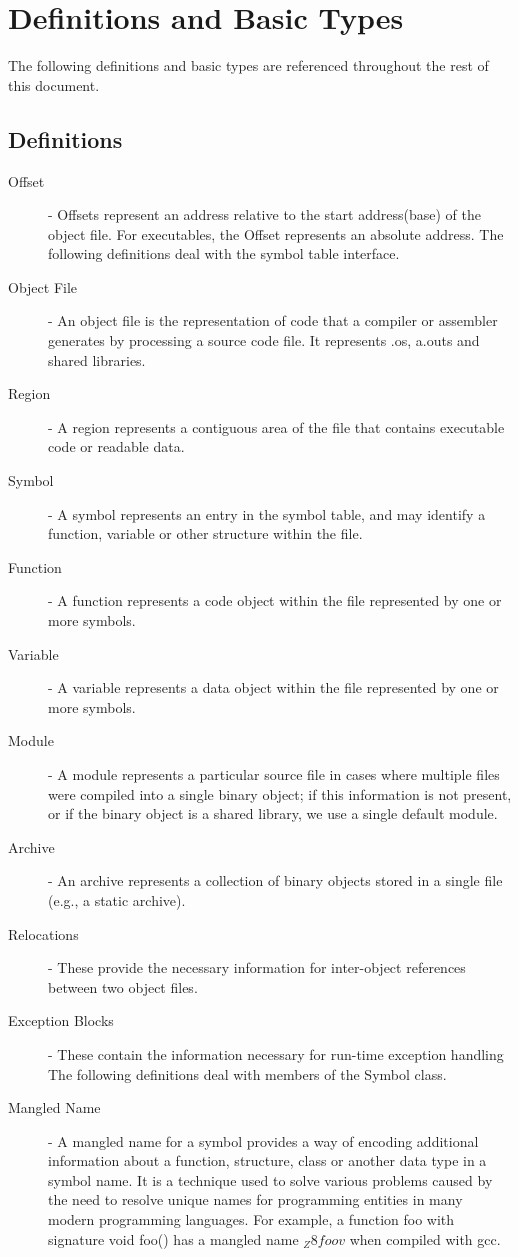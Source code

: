\section{Definitions and Basic Types}

The following definitions and basic types are referenced throughout the rest of this document.

\subsection{Definitions}

\begin{description}
\item[Offset] - Offsets represent an address relative to the start address(base) of the object file. For executables, the Offset represents an absolute address.
The following definitions deal with the symbol table interface.
\item[Object File] - An object file is the representation of code that a compiler or assembler generates by processing a source code file. It represents .os, a.outs and shared libraries.
\item[Region] - A region represents a contiguous area of the file that contains executable code or readable data.
\item[Symbol] - A symbol represents an entry in the symbol table, and may identify a function, variable or other structure within the file.
\item[Function] - A function represents a code object within the file represented by one or more symbols.
\item[Variable] - A variable represents a data object within the file represented by one or more symbols.
\item[Module] - A module represents a particular source file in cases where multiple files were compiled into a single binary object; if this information is not present, or if the binary object is a shared library, we use a single default module.
\item[Archive] - An archive represents a collection of binary objects stored in a single file (e.g., a static archive). 
\item[Relocations] - These provide the necessary information for inter-object references between two object files. 
\item[Exception Blocks] - These contain the information necessary for run-time exception handling
The following definitions deal with members of the Symbol class.
\item[Mangled Name] - A mangled name for a symbol provides a way of encoding additional information about a function, structure, class or another data type in a symbol name. It is a technique used to solve various problems caused by the need to resolve unique names for programming entities in many modern programming languages. For example, a function foo with signature void foo() has a mangled name $_Z8foov$ when compiled with gcc.

\end{description}
